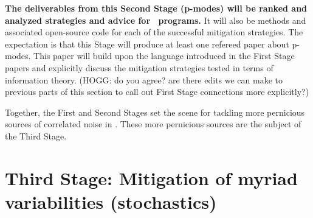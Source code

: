 \documentclass[12pt, letterpaper]{article}
\begin{document}
\textbf{The deliverables from this Second Stage (p-modes) will be ranked
and analyzed strategies and advice for \EPRV\ programs.} It will
also be methods and associated open-source code for each of the successful
mitigation strategies.
The expectation is that this Stage will produce at least one
refereed paper about p-modes. 
This paper will build upon the language introduced in the First Stage 
papers and explicitly discuss the mitigation strategies tested in 
terms of information theory. (HOGG: do you agree? are there edits we
can make to previous parts of this section to call out First Stage 
connections more explicitly?)

Together, the First and Second Stages set the scene for tackling more
pernicious sources of correlated noise in \EPRV.
These more pernicious sources are the subject of the Third Stage.

\section{Third Stage: Mitigation of myriad variabilities (stochastics)}
\end{document}
